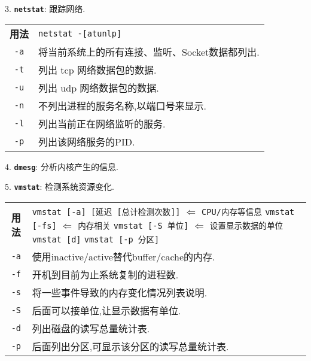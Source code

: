 \par
3. \textbf{\texttt{netstat}}: 跟踪网络.
\begin{longtable}{c@{ : }p{}}\hline\hline

    \textbf{用法} & \verb"netstat -[atunlp]"\\

    \texttt{-a} & 将当前系统上的所有连接、监听、Socket数据都列出. \\

    \texttt{-t} & 列出 tcp 网络数据包的数据.\\

    \texttt{-u} & 列出 udp 网络数据包的数据. \\

    \texttt{-n} & 不列出进程的服务名称,以端口号来显示. \\

    \texttt{-l} & 列出当前正在网络监听的服务. \\

    \texttt{-p} & 列出该网络服务的PID. \\

    \hline
\end{longtable}

\par
4. \textbf{\texttt{dmesg}}: 分析内核产生的信息.

\par
5. \textbf{\texttt{vmstat}}: 检测系统资源变化.
\begin{longtable}{c@{ : }p{}}\hline\hline

    \textbf{用法} & \verb"vmstat [-a] [延迟 [总计检测次数]]" \quad$\Longleftarrow$ \texttt{CPU/内存等信息} \newline
                    \verb"vmstat [-fs]" \quad$\Longleftarrow$ \texttt{内存相关}\newline
                    \verb"vmstat [-S 单位]" \quad$\Longleftarrow$ \texttt{设置显示数据的单位}\newline
                    \verb"vmstat [d]" \newline
                    \verb"vmstat [-p 分区]"\\

    \texttt{-a} & 使用inactive/active替代buffer/cache的内存. \\

    \texttt{-f} & 开机到目前为止系统复制的进程数.\\

    \texttt{-s} & 将一些事件导致的内存变化情况列表说明. \\

    \texttt{-S} & 后面可以接单位,让显示数据有单位. \\

    \texttt{-d} & 列出磁盘的读写总量统计表. \\

    \texttt{-p} & 后面列出分区,可显示该分区的读写总量统计表. \\

    \hline
\end{longtable}


